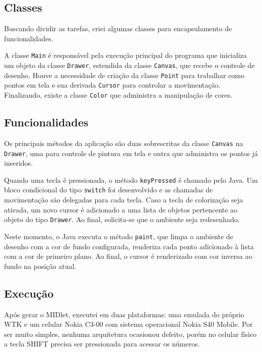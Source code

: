 \documentclass{article}
\begin{document}
\subsection{Classes}

Buscando dividir as tarefas, criei algumas classes para encapsulamento de
funcionalidades.

A classe \texttt{Main} é responsável pela execução principal do programa que
inicializa um objeto da classe \texttt{Drawer}, estendida da classe
\texttt{Canvas}, que recebe o controle de desenho. Houve a necessidade de
criação da classe \texttt{Point} para trabalhar como pontos em tela e sua
derivada \texttt{Cursor} para controlar a movimentação. Finalizando, existe a
classe \texttt{Color} que administra a manipulação de cores.

\subsection{Funcionalidades}

Os principais métodos da aplicação são duas sobrescritas da classe
\texttt{Canvas} na \texttt{Drawer}, uma para controle de pintura em tela e
outra que administra os pontos já inseridos.

Quando uma tecla é pressionada, o método \texttt{keyPressed} é chamado pelo
Java. Um bloco condicional do tipo \texttt{switch} foi desenvolvido e as
chamadas de movimentação são delegadas para cada tecla. Caso a tecla de
colorização seja ativada, um novo cursor é adicionado a uma lista de objetos
pertencente ao objeto do tipo \texttt{Drawer}. Ao final, solicita-se que o
ambiente seja redesenhado.

Neste momento, o Java executa o método \texttt{paint}, que limpa o ambiente de
desenho com a cor de fundo configurada, renderiza cada ponto adicionado à lista
com a cor de primeiro plano. Ao final, o cursor é renderizado com cor inversa ao
fundo na posição atual.

\subsection{Execução}

Após gerar o MIDlet, executei em duas plataformas: uma emulada do próprio WTK e
um celular Nokia C3-00 com sistema operacional Nokia S40 Mobile. Por ser muito
simples, nenhuma arquitetura ocasionou defeito, porém no celular físico a tecla
SHIFT precisa ser pressionada para acessar os números.
\end{document}
